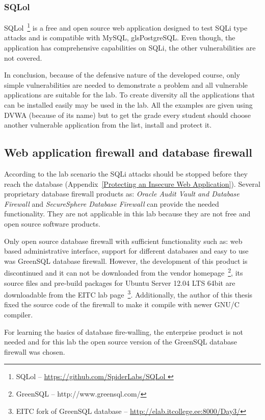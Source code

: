 \subsubsection{SQLol}
SQLol~\footnote{SQLol -- \url{https://github.com/SpiderLabs/SQLol
}} is a free and open source web application designed to test \gls{SQLi} type attacks and is compatible with \gls{MySQL}, gls{PostgreSQL}. Even though, the application has comprehensive capabilities on \gls{SQLi}, the other vulnerabilities are not covered.


In conclusion, because of the defensive nature of the developed course, only simple vulnerabilities are needed to demonstrate a problem and all vulnerable applications are suitable for the lab. To create diversity all the applications that can be installed easily may be used in the lab. All the examples are given using \gls{DVWA} (because of its name) but to get the grade every student should choose another vulnerable application from the list, install  and protect it.

\subsection{Web application firewall and database firewall}


According to the lab scenario the \gls{SQLi} attacks should be stopped before they reach the database (Appendix~\ref{Protecting an Insecure Web Application}). Several proprietary database firewall products as: \emph{Oracle Audit Vault and Database Firewall} and \emph{SecureSphere Database Firewall} can provide the needed functionality. They are not applicable in this lab because they are not free and open source software products.

Only open source database firewall with sufficient functionality such as: web based administrative interface, support for different databases and easy to use was GreenSQL database firewall. However, the development of this product is discontinued  and it can not be downloaded from the vendor homepage~\footnote{GreenSQL -- http://www.greensql.com/}, its source files and pre-build packages for Ubuntu Server 12.04 LTS 64bit are downloadable from the \gls{EITC} lab page~\footnote{\gls{EITC} fork of GreenSQL database -- \url{http://elab.itcollege.ee:8000/Day3/}}. Additionally, the author of this thesis fixed the source code of the firewall to make it compile with newer GNU/C compiler.

For learning the basics of database fire-walling, the enterprise product is not needed and for this lab the open source version of the GreenSQL database firewall was chosen.

